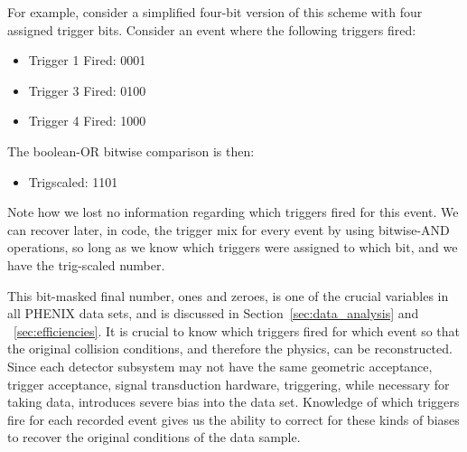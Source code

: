 For example, consider a simplified four-bit version of this scheme with four
assigned trigger bits. Consider an event where the following triggers fired:

\begin{itemize}
    \item Trigger 1 Fired: 0001
    \item Trigger 3 Fired: 0100
    \item Trigger 4 Fired: 1000
\end{itemize}

The boolean-OR bitwise comparison is then:

\begin{itemize}
  \item Trigscaled: 1101
\end{itemize}

Note how we lost no information regarding which triggers fired for this event.
We can recover later, in code, the trigger mix for every event by using
bitwise-AND operations, so long as we know which triggers were assigned to which
bit, and we have the trig-scaled number.

This bit-masked final number, ones and zeroes, is one of the crucial variables
in all PHENIX data sets, and is discussed in Section~\ref{sec:data_analysis} and
~\ref{sec:efficiencies}. It is crucial to know which triggers fired for which
event so that the original collision conditions, and therefore the physics, can
be reconstructed. Since each detector subsystem may not have the same geometric
acceptance, trigger acceptance, signal transduction hardware, triggering, while
necessary for taking data, introduces severe bias into the data set. Knowledge
of which triggers fire for each recorded event gives us the ability to correct
for these kinds of biases to recover the original conditions of the data sample.
